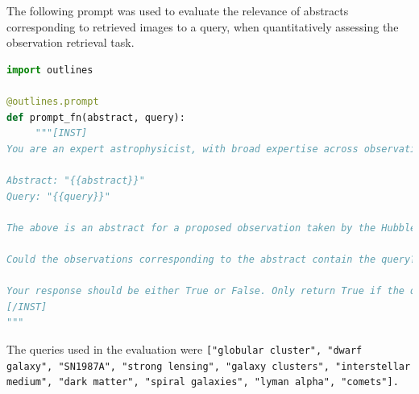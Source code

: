 \documentclass{article} %
\newcommand{\changes}[1]{#1}
\begin{document}
\changes{The following prompt was used to evaluate the relevance of abstracts corresponding to retrieved images to a query, when quantitatively assessing the observation retrieval task.}

\begin{lstlisting}[language=Python]
import outlines

@outlines.prompt
def prompt_fn(abstract, query):
     """[INST]
You are an expert astrophysicist, with broad expertise across observational and theoretical astrophysics.

Abstract: "{{abstract}}"
Query: "{{query}}"

The above is an abstract for a proposed observation taken by the Hubble Space Telescope (labeled "Abstract"), and an object or concept (labeled "Query").

Could the observations corresponding to the abstract contain the query? Be precise, and do not contain related concepts or objects. 

Your response should be either True or False. Only return True if the query is closely related to the abstract, and the downstream observation could be relevant to the query.
[/INST]
"""
\end{lstlisting}

\changes{The queries used in the evaluation were \texttt{["globular cluster", "dwarf galaxy", "SN1987A", "strong lensing", "galaxy clusters", "interstellar medium", "dark matter", "spiral galaxies", "lyman alpha", "comets"].}}



\end{document}
